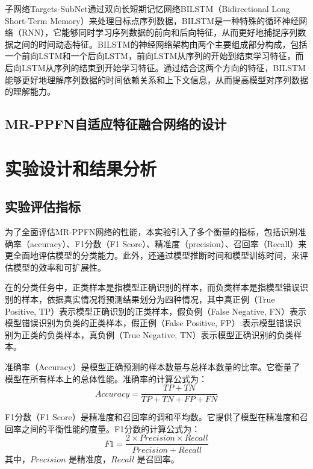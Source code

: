 子网络Targets-SubNet通过双向长短期记忆网络BILSTM（Bidirectional Long Short-Term Memory）来处理目标点序列数据，BILSTM是一种特殊的循环神经网络（RNN），它能够同时学习序列数据的前向和后向特征，从而更好地捕捉序列数据之间的时间动态特征。BILSTM的神经网络架构由两个主要组成部分构成，包括一个前向LSTM和一个后向LSTM，前向LSTM从序列的开始到结束学习特征，而后向LSTM从序列的结束到开始学习特征。通过结合这两个方向的特征，BILSTM能够更好地理解序列数据的时间依赖关系和上下文信息，从而提高模型对序列数据的理解能力。

\subsection{MR-PPFN自适应特征融合网络的设计}
\label{subsec:MR-PPFN Adaptive Feature Fusion Network Design}




\section{实验设计和结果分析}
\subsection{实验评估指标}
为了全面评估MR-PPFN网络的性能，本实验引入了多个衡量的指标，包括识别准确率（accuracy）、F1分数（F1 Score）、精准度（precision）、召回率（Recall）来更全面地评估模型的分类能力。此外，还通过模型推断时间和模型训练时间，来评估模型的效率和可扩展性。

在的分类任务中，正类样本是指模型正确识别的样本，而负类样本是指模型错误识别的样本，依据真实情况将预测结果划分为四种情况，其中真正例（True Positive, TP）表示模型正确识别的正类样本，假负例（False Negative, FN）表示模型错误识别为负类的正类样本，假正例（False Positive, FP）:表示模型错误识别为正类的负类样本，真负例（True Negative, TN）表示模型正确识别的负类样本。

准确率（Accuracy）是模型正确预测的样本数量与总样本数量的比率。它衡量了模型在所有样本上的总体性能。准确率的计算公式为：
\begin{equation}
    \label{eq:accuracy}
    Accuracy = \frac{TP + TN}{TP + TN + FP + FN}
\end{equation}

F1分数（F1 Score）是精准度和召回率的调和平均数。它提供了模型在精准度和召回率之间的平衡性能的度量。F1分数的计算公式为：
\begin{equation}
    \label{eq:f1}
    F1 = \frac{2 \times Precision \times Recall}{Precision + Recall}
\end{equation}
其中，$Precision$ 是精准度，$Recall$ 是召回率。

